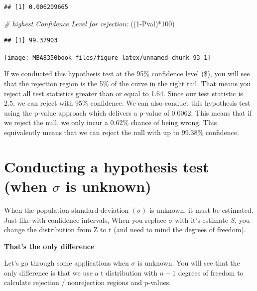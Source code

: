 \documentclass[
]{book}
\newenvironment{Shaded}{\begin{snugshade}}{\end{snugshade}}
\newcommand{\CommentTok}[1]{\textcolor[rgb]{0.56,0.35,0.01}{\textit{#1}}}
\newcommand{\DecValTok}[1]{\textcolor[rgb]{0.00,0.00,0.81}{#1}}
\newcommand{\NormalTok}[1]{#1}
\newcommand{\SpecialCharTok}[1]{\textcolor[rgb]{0.00,0.00,0.00}{#1}}
\begin{document}
\begin{verbatim}
## [1] 0.006209665
\end{verbatim}

\begin{Shaded}
\begin{Highlighting}[]
\CommentTok{\# highest Confidence Level for rejection:}
\NormalTok{((}\DecValTok{1}\SpecialCharTok{{-}}\NormalTok{Pval)}\SpecialCharTok{*}\DecValTok{100}\NormalTok{)}
\end{Highlighting}
\end{Shaded}

\begin{verbatim}
## [1] 99.37903
\end{verbatim}

\begin{center}\texttt{[image: MBA8350book\_files/figure-latex/unnamed-chunk-93-1]} \end{center}

If we conducted this hypothesis test at the 95\% confidence level (\$), you will see that the rejection region is the 5\% of the curve in the right tail. That means you reject all test statistics greater than or equal to 1.64. Since our test statistic is 2.5, we can reject with 95\% confidence. We can also conduct this hypothesis test using the p-value approach which delivers a p-value of 0.0062. This means that if we reject the null, we only incur a 0.62\% chance of being wrong. This equivalently means that we can reject the null with up to 99.38\% confidence.

\hypertarget{conducting-a-hypothesis-test-when-sigma-is-unknown}{%
\section{\texorpdfstring{Conducting a hypothesis test (when \(\sigma\) is unknown)}{Conducting a hypothesis test (when \textbackslash sigma is unknown)}}\label{conducting-a-hypothesis-test-when-sigma-is-unknown}}

When the population standard deviation \((\sigma)\) is unknown, it must be estimated. Just like with confidence intervals, When you replace \(\sigma\) with it's estimate \(S\), you change the distribution from Z to t (and need to mind the degrees of freedom).

\textbf{That's the only difference}

Let's go through some applications when \(\sigma\) is unknown. You will see that the only difference is that we use a t distribution with \(n-1\) degrees of freedom to calculate rejection / nonrejection regions and p-values.
\end{document}

